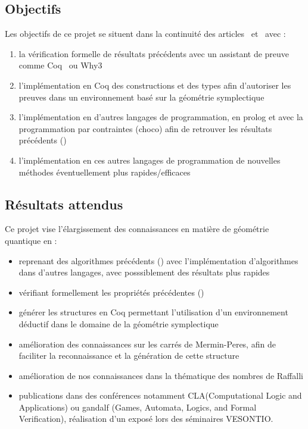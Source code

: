 \documentclass[10pt, a4paper, french]{article}
\begin{document}
\subsection{Objectifs}

Les objectifs de ce projet se situent dans la continuité des articles~\cite{contextAG} et~\cite{MULLER2022101853} avec :
\begin{enumerate}
    \item la vérification formelle de résultats précédents avec un assistant de preuve comme Coq~\cite{the_coq_development_team_2019_3476303} ou Why3~\cite{conf/esop/FilliatreP13}
    \item l'implémentation en Coq des constructions et des types afin d'autoriser les preuves dans un environnement basé sur la géométrie symplectique  
    \item l'implémentation en d'autres langages de programmation, en prolog et avec la programmation par contraintes (choco) afin de retrouver les résultats précédents (\cite{contextAG, MULLER2022101853})
    \item l'implémentation en ces autres langages de programmation de nouvelles méthodes éventuellement plus rapides/efficaces
\end{enumerate}


\subsection{Résultats attendus}

Ce projet vise l'élargissement des connaissances en matière de géométrie quantique en :

\begin{itemize}
    \item reprenant des algorithmes précédents (\cite{contextAG, MULLER2022101853}) avec l'implémentation d'algorithmes dans d'autres langages, avec posssiblement des résultats plus rapides
    \item vérifiant formellement les propriétés précédentes (\cite{contextAG, MULLER2022101853})
    \item générer les structures en Coq permettant l'utilisation d'un environnement déductif dans le domaine de la géométrie symplectique
    \item amélioration des connaissances sur les carrés de Mermin-Peres, afin de faciliter la reconnaissance et la génération de cette structure
    \item amélioration de nos connaissances dans la thématique des nombres de Raffalli
    \item publications dans des conférences notamment CLA(Computational Logic and Applications) ou gandalf (Games, Automata, Logics, and Formal Verification), réalisation d'un exposé lors des séminaires VESONTIO.
\end{itemize}
\end{document}
